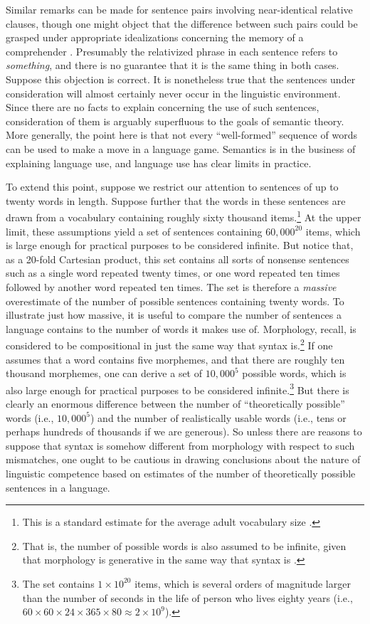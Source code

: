 Similar remarks can be made for sentence pairs involving near-identical relative clauses, though one might object that the difference between such pairs could be grasped under appropriate idealizations concerning the memory of a comprehender \citep{FodorPylyshyn:1988}. Presumably the relativized phrase in each sentence refers to \textit{something}, and there is no guarantee that it is the same thing in both cases. Suppose this objection is correct. It is nonetheless true that the sentences under consideration will almost certainly never occur in the linguistic environment. Since there are no facts to explain concerning the use of such sentences, consideration of them is arguably superfluous to the goals of semantic theory. More generally, the point here is that not every ``well-formed'' sequence of words can be used to make a move in a language game. Semantics is in the business of explaining language use, and language use has clear limits in practice.

To extend this point, suppose we restrict our attention to sentences of up to twenty words in length. Suppose further that the words in these sentences are drawn from a vocabulary containing roughly sixty thousand items.\footnote{This is a standard estimate for the average adult vocabulary size \citep{Pinker:1994,Harley:2014}.} At the upper limit, these assumptions yield a set of sentences containing $60,000^{20}$ items, which is large enough for practical purposes to be considered infinite. But notice that, as a 20-fold Cartesian product, this set contains all sorts of nonsense sentences such as a single word repeated twenty times, or one word repeated ten times followed by another word repeated ten times. The set is therefore a \textit{massive} overestimate of the number of possible sentences containing twenty words. To illustrate just how massive, it is useful to compare the number of sentences a language contains to the number of words it makes use of. Morphology, recall, is considered to be compositional in just the same way that syntax is.\footnote{That is, the number of possible words is also assumed to be infinite, given that morphology is generative in the same way that syntax is \citep{Pinker:1994}.} If one assumes that a word contains five morphemes, and that there are roughly ten thousand morphemes, one can derive a set of $10,000^{5}$ possible words, which is also large enough for practical purposes to be considered infinite.\footnote{The set contains $1 \times 10^{20}$ items, which is several orders of magnitude larger than the number of seconds in the life of person who lives eighty years (i.e., $60 \times 60 \times 24 \times 365 \times 80 \approx 2 \times 10^{9}$).} But there is clearly an enormous difference between the number of ``theoretically possible'' words (i.e., $10,000^{5}$) and the number of realistically usable words (i.e., tens or perhaps hundreds of thousands if we are generous). So unless there are reasons to suppose that syntax is somehow different from morphology with respect to such mismatches, one ought to be cautious in drawing conclusions about the nature of linguistic competence based on estimates of the number of theoretically possible sentences in a language.

